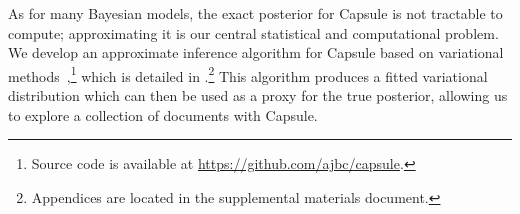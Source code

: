 As for many Bayesian models, the exact posterior for Capsule is not tractable to compute; approximating it is our central statistical and computational problem.  We develop an approximate inference algorithm for Capsule based on variational methods~\cite{Jordan:1999},\footnote{Source code is available at \url{https://github.com/ajbc/capsule}.} which is detailed in .\footnote{Appendices are located in the supplemental materials document.} This algorithm produces a fitted variational distribution which can then be used as a proxy for the true posterior, allowing us to explore a collection of documents with Capsule.  


